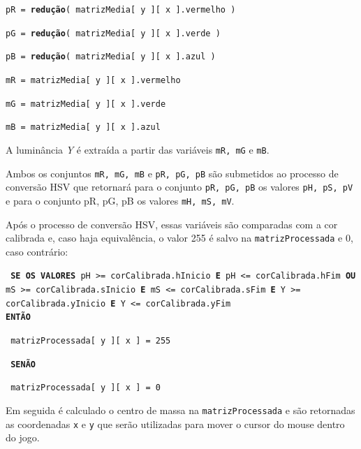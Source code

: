 \documentclass[12pt]{article}
\begin{document}
\texttt{\footnotesize{pR = \textbf{redu\c c\~ao}( matrizMedia[ y ][ x ].vermelho )}}

\texttt{\footnotesize{pG = \textbf{redu\c c\~ao}( matrizMedia[ y ][ x ].verde )}}

\texttt{\footnotesize{pB = \textbf{redu\c c\~ao}( matrizMedia[ y ][ x ].azul )}}

\vspace{0.5cm}

\texttt{\footnotesize{mR = matrizMedia[ y ][ x ].vermelho}}

\texttt{\footnotesize{mG = matrizMedia[ y ][ x ].verde}}

\texttt{\footnotesize{mB = matrizMedia[ y ][ x ].azul}}


A lumin\^ancia \emph{Y} \'e extra\'ida a partir das vari\'aveis \texttt{mR, mG} e \texttt{mB}.

Ambos os conjuntos \texttt{mR, mG, mB} e \texttt{pR, pG, pB} s\~ao submetidos ao processo de convers\~ao HSV que retornar\'a
para o conjunto \texttt{pR, pG, pB} os valores \texttt{pH, pS, pV} e para o conjunto {pR, pG, pB} os valores \texttt{mH, mS, mV}.

Ap\'os o processo de convers\~ao HSV, essas vari\'aveis s\~ao comparadas com a cor calibrada e, caso haja equival\^encia,
o valor 255 \'e salvo na \texttt{matrizProcessada} e 0, caso contr\'ario:

\noindent \texttt{\footnotesize{ \textbf{SE OS VALORES}} {pH >= corCalibrada.hInicio} \footnotesize{\textbf{E}} \footnotesize{pH <= corCalibrada.hFim} \footnotesize{\textbf{OU}} \footnotesize{mS >= corCalibrada.sInicio} \footnotesize{\textbf{E}} \footnotesize{mS <= corCalibrada.sFim} \footnotesize{\textbf{E}} \footnotesize{Y >= corCalibrada.yInicio} \footnotesize{\textbf{E}} \footnotesize{Y <= corCalibrada.yFim} \\{\textbf{ENT\~AO}}}

\hspace{0.3cm} \texttt{\footnotesize{ matrizProcessada[ y ][ x ] = 255}}

\hspace{0.1cm} \texttt{\footnotesize{ \textbf{SEN\~AO}}}

\hspace{0.3cm} \texttt{\footnotesize{ matrizProcessada[ y ][ x ] = 0}}


Em seguida \'e calculado o centro de massa na \texttt{matrizProcessada} e s\~ao retornadas as coordenadas \texttt{x} e \texttt{y}
que ser\~ao utilizadas para mover o cursor do mouse dentro do jogo.
\end{document}
